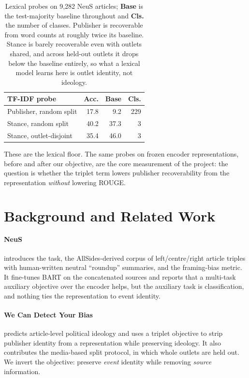 \documentclass[11pt]{article}
\begin{document}
\begin{table}[t]
\centering\small
\setlength{\tabcolsep}{4pt}
\begin{tabular}{@{}lrrr@{}}
\toprule
\textbf{TF-IDF probe} & \textbf{Acc.} & \textbf{Base} & \textbf{Cls.} \\
\midrule
Publisher, random split  & 17.8 & 9.2  & 229 \\
Stance, random split     & 40.2 & 37.3 & 3 \\
Stance, outlet-disjoint  & 35.4 & 46.0 & 3 \\
\bottomrule
\end{tabular}
\caption{Lexical probes on 9{,}282 NeuS articles; \textbf{Base} is the
test-majority baseline throughout and \textbf{Cls.} the number of classes.
Publisher is recoverable from word counts at roughly twice its baseline. Stance
is barely recoverable even with outlets shared, and across held-out outlets it
drops below the baseline entirely, so what a lexical model learns here is
outlet identity, not ideology.}
\label{tab:probe}
\end{table}

These are the lexical floor. The same probes on frozen encoder representations,
before and after our objective, are the core measurement of the project: the
question is whether the triplet term lowers publisher recoverability from the
representation \emph{without} lowering ROUGE.

\section{Background and Related Work}

\paragraph{NeuS} \citep{lee2022neus} introduces the task, the AllSides-derived
corpus of left/centre/right article triples with human-written neutral
``roundup'' summaries, and the framing-bias metric. It fine-tunes BART
\citep{lewis2020bart} on the concatenated sources and reports that a multi-task
auxiliary objective over the encoder helps, but the auxiliary task is
classification, and nothing ties the representation to event identity.

\paragraph{We Can Detect Your Bias} \citep{baly2020detect} predicts
article-level political ideology and uses a triplet objective to strip publisher
identity from a representation while preserving ideology. It also contributes the
media-based split protocol, in which whole outlets are held out. We invert the
objective: preserve \emph{event} identity while removing \emph{source}
information.
\end{document}
